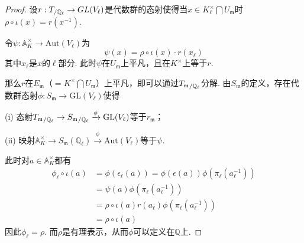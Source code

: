 \begin{proof}
    设$r: {T}_{/\mathbb{Q}_{\ell}} \to GL(V_{\ell})$是代数群的态射使得当$x\in K_{\ell}^{\times}\bigcap U_{\mathfrak{m}}$时$\rho\circ\iota(x) = r(x^{-1})$.

    令$\psi: \mathbb{A}_{K}^{\times}\to \mathrm{Aut}(V_{\ell})$为
    \begin{equation}
        \psi(x) = \rho\circ \iota(x) \cdot r(x_{\ell})
    \end{equation}
    其中$x_{\ell}$是$x$的$\ell$部分. 此时$\psi$在$U_{\mathfrak{m}}$上平凡，且在$K^{\times}$上等于$r$.

    那么$r$在$E_{\mathfrak{m}}$（$=K^{\times} \bigcap U_{\mathfrak{m}}$）上平凡，即可以通过${T_{\mathfrak{m}}}_{/\mathbb{Q}_{\ell}}$分解. 由$S_{\mathfrak{m}}$的定义，存在代数群态射$\phi: S_{\mathfrak{m}}\to \mathrm{GL}(V_{\ell})$使得

    (i) 态射${T_{\mathfrak{m}}}_{/\mathbb{Q}_{\ell}} \to {S_{\mathfrak{m}}}_{/\mathbb{Q}_{\ell}}\xrightarrow{\phi} \mathrm{GL}(V_{\ell})$等于$r_{\mathfrak{m}}$；

    (ii) 映射$\mathbb{A}_{K}^{\times}\to S_{\mathfrak{m}}(\mathbb{Q}_{\ell})\xrightarrow{\phi} \mathrm{Aut}(V_{\ell})$等于$\psi$.

    此时对$a\in \mathbb{A}_{K}^{\times}$都有
    \begin{align}
        \phi_{\ell}\circ\iota(a)
        &= \phi(\epsilon_{\ell}(a)) = \phi(\epsilon(a))\phi(\pi_{\ell}(a_{\ell}^{-1}))\\
        &= \psi(a)\phi(\pi_{\ell}(a_{\ell}^{-1}))\\
        &= \rho\circ\iota(a) r(a_{\ell})\phi(\pi_{\ell}(a_{\ell}^{-1}))\\
        &= \rho\circ\iota(a)
    \end{align}
    因此$\phi_{\ell}=\rho$.
    而$\rho$是有理表示，从而$\phi$可以定义在$\mathbb{Q}$上.
\end{proof}

